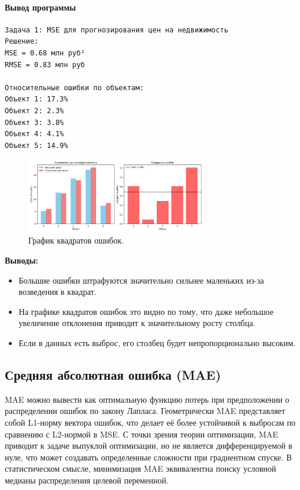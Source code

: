 \documentclass[12pt]{article}
\theoremstyle{definition}
\theoremstyle{definition}
\theoremstyle{definition}
\theoremstyle{remark}
\theoremstyle{remark}
\begin{document}
\paragraph{Вывод программы}
\begin{verbatim}
Задача 1: MSE для прогнозирования цен на недвижимость
Решение:
MSE = 0.68 млн руб²
RMSE = 0.83 млн руб

Относительные ошибки по объектам:
Объект 1: 17.3%
Объект 2: 2.3%
Объект 3: 3.8%
Объект 4: 4.1%
Объект 5: 14.9%
\end{verbatim}
\begin{figure}[h!]
    \centering
    \includegraphics[width=0.7\textwidth]{imgs/mse.png}
    \caption{График квадратов ошибок.}
    \label{fig:mse_graph}
\end{figure}

\noindent\textbf{Выводы:}
\begin{itemize}
    \item Большие ошибки штрафуются значительно сильнее маленьких из-за возведения в квадрат.
    \item На графике квадратов ошибок это видно по тому, что даже небольшое увеличение отклонения приводит к значительному росту столбца.
    \item Если в данных есть выброс, его столбец будет непропорционально высоким.
\end{itemize}
\subsection{Средняя абсолютная ошибка (MAE)}

MAE можно вывести как оптимальную функцию потерь при предположении о распределении ошибок по закону Лапласа. Геометрически MAE представляет собой L1-норму вектора ошибок, что делает её более устойчивой к выбросам по сравнению с L2-нормой в MSE. С точки зрения теории оптимизации, MAE приводит к задаче выпуклой оптимизации, но не является дифференцируемой в нуле, что может создавать определенные сложности при градиентном спуске. В статистическом смысле, минимизация MAE эквивалентна поиску условной медианы распределения целевой переменной.
\end{document}
